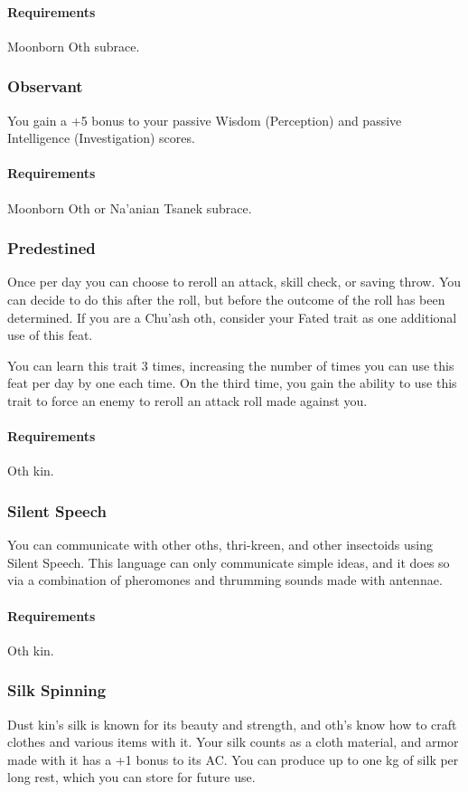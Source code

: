        \paragraph{Requirements} Moonborn Oth subrace.
    \subsubsection{Observant} \label{feat::observant}
        You gain a +5 bonus to your passive Wisdom (Perception) and passive Intelligence (Investigation) scores.
        \paragraph{Requirements} Moonborn Oth or Na'anian Tsanek subrace.
    \subsubsection{Predestined} \label{feat::predenstined}
        Once per day you can choose to reroll an attack, skill check, or saving throw.
        You can decide to do this after the roll, but before the outcome of the roll has been determined.
        If you are a Chu'ash oth, consider your Fated trait as one additional use of this feat.

        You can learn this trait 3 times, increasing the number of times you can use this feat per day by one each time.
        On the third time, you gain the ability to use this trait to force an enemy to reroll an attack roll made against you.
        \paragraph{Requirements} Oth kin.
    \subsubsection{Silent Speech} \label{feat::silentspeech}
        You can communicate with other oths, thri-kreen, and other insectoids using Silent Speech.
        This language can only communicate simple ideas, and it does so via a combination of pheromones and thrumming sounds made with antennae.
        \paragraph{Requirements} Oth kin.
    \subsubsection{Silk Spinning} \label{feat::silkspinning}
        Dust kin's silk is known for its beauty and strength, and oth's know how to craft clothes and various items with it.
        Your silk counts as a cloth material, and armor made with it has a +1 bonus to its AC.
        You can produce up to one kg of silk per long rest, which you can store for future use.
